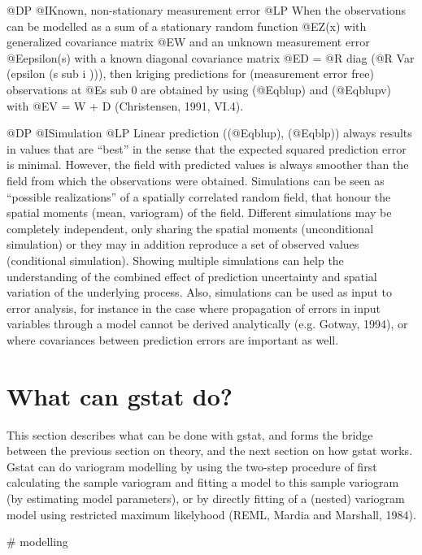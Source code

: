 \documentclass{article}
\begin{document}
@DP
@I{Known, non-stationary measurement error}
@LP
When the observations can be modelled as a sum of a stationary random
function @E{Z(x)} with generalized covariance matrix @E{W} and an
unknown measurement error @E{epsilon(s)} with a known diagonal
covariance matrix @E{D = @R diag (@R Var (epsilon (s sub i )))}, then
kriging predictions for (measurement error free) observations at @E{s
sub 0} are obtained by using (@Eqblup) and (@Eqblupv) with @E{V = W + D}
(Christensen, 1991, VI.4).

@DP
@I{Simulation}
@LP
Linear prediction ((@Eqblup), (@Eqblp)) always results in values that
are ``best'' in the sense that the expected squared prediction error is
minimal. However, the field with predicted values is always smoother
than the field from which the observations were obtained. Simulations
can be seen as ``possible realizations'' of a spatially correlated
random field, that honour the spatial moments (mean, variogram) of the
field. Different simulations may be completely independent, only sharing
the spatial moments (unconditional simulation) or they may in addition
reproduce a set of observed values (conditional simulation). Showing
multiple simulations can help the understanding of the combined effect
of prediction uncertainty and spatial variation of the underlying
process. Also, simulations can be used as input to error analysis, for
instance in the case where propagation of errors in input variables
through a model cannot be derived analytically (e.g. Gotway, 1994), or
where covariances between prediction errors are important as well.

\section{What can gstat do? }
\label{what}

This section describes what can be done with gstat, and forms the bridge
between the previous section on theory, and the next section on how
gstat works. Gstat can do variogram modelling by using the two-step
procedure of first calculating the sample variogram and fitting a model
to this sample variogram (by estimating model parameters), or by
directly fitting of a (nested) variogram model using restricted maximum
likelyhood (REML, Mardia and Marshall, 1984).

# modelling
\end{document}
